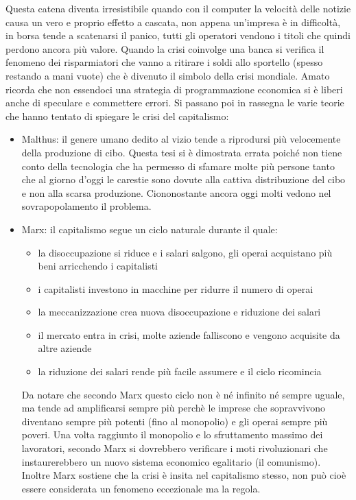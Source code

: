 \documentclass[11pt]{article}
\begin{document}
Questa catena diventa irresistibile quando con il computer la velocit\`a delle notizie
causa un vero e proprio effetto a cascata, non appena un'impresa \`e in difficolt\`a,
in borsa tende a scatenarsi il panico, tutti gli operatori vendono i titoli che quindi 
perdono ancora pi\`u valore.
Quando la crisi coinvolge una banca si verifica il 
fenomeno dei risparmiatori che vanno a ritirare i soldi allo sportello (spesso restando a mani vuote)
che \`e divenuto il simbolo della crisi mondiale.
Amato ricorda che non essendoci una strategia di programmazione economica
si \`e liberi anche di speculare e commettere errori.
Si passano poi in rassegna le varie teorie che hanno tentato di spiegare le crisi del capitalismo:
\begin{itemize}
\item Malthus: il genere umano dedito al vizio tende a riprodursi pi\`u velocemente della produzione di cibo. 
Questa tesi si \`e dimostrata errata poich\'e non tiene conto della 
tecnologia che ha permesso di sfamare molte pi\`u persone tanto che al giorno d'oggi le carestie sono
dovute alla cattiva distribuzione del cibo e non alla scarsa produzione.
Ciononostante ancora oggi molti vedono nel sovrapopolamento il problema.
\item Marx: il capitalismo segue un ciclo naturale durante il quale:
	\begin{itemize}
	\item la disoccupazione si riduce e i salari salgono, gli operai acquistano pi\`u beni arricchendo i capitalisti
	\item i capitalisti investono in macchine per ridurre il numero di operai
	\item la meccanizzazione crea nuova disoccupazione e riduzione dei salari
	\item il mercato entra in crisi, molte aziende falliscono e vengono acquisite da altre aziende
	\item la riduzione dei salari rende pi\`u facile assumere e il ciclo ricomincia
\end{itemize}
Da notare che secondo Marx questo ciclo non \`e n\'e infinito n\'e sempre uguale,
ma tende ad amplificarsi sempre pi\`u perch\`e le imprese che sopravvivono 
diventano sempre pi\`u potenti (fino al monopolio) e gli operai sempre
pi\`u poveri. Una volta raggiunto il monopolio e lo sfruttamento massimo dei lavoratori, secondo Marx
si dovrebbero verificare i moti rivoluzionari che instaurerebbero un nuovo sistema economico
egalitario (il comunismo). Inoltre Marx sostiene che la crisi \`e insita nel capitalismo stesso, non pu\`o cio\`e
essere considerata un fenomeno eccezionale ma la regola.


\end{itemize}
\end{document}
